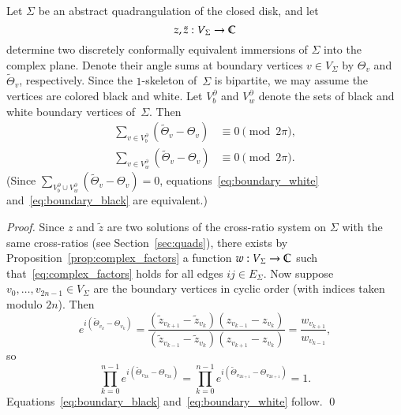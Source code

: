 \documentclass[Thesis]{subfiles}
\begin{document}
\begin{theorem}
  Let $\Sigma$ be an abstract quadrangulation of the closed disk, and
  let 
  \begin{equation*}
    z,\tilde z: V_{\Sigma}\rightarrow\mathbb C
  \end{equation*}
  determine two discretely conformally equivalent immersions of\/
  $\Sigma$ into the complex plane. Denote their angle sums at boundary
  vertices $v\in V_{\Sigma}$ by\/ $\Theta_{v}$ and\/
  $\tilde\Theta_{v}$, respectively. Since the $1$-skeleton of\/~$\Sigma$ is
  bipartite, we may assume the vertices are colored black and
  white. Let $V^{\partial}_{b}$ and $V^{\partial}_{w}$ denote the sets
  of black and white boundary vertices of\/~$\Sigma$. Then
  \begin{align}
    \label{eq:boundary_black}
    \sum_{v\in V^{\partial}_b}(\tilde\Theta_v - \Theta_v)
    &\equiv 0 \pmod{2\pi},\\
    \label{eq:boundary_white}
    \sum_{v\in V^{\partial}_w}(\tilde\Theta_v - \Theta_v)
    &\equiv 0 \pmod{2\pi}.
  \end{align}
  (Since $\sum_{V^{\partial}_b \cup
    V^{\partial}_w}(\tilde\Theta_{v}-\Theta_{v})=0$,
  equations~\eqref{eq:boundary_white} and~\eqref{eq:boundary_black}
  are equivalent.)
\end{theorem}

\begin{proof}
  Since $z$ and $\tilde z$ are two solutions of the cross-ratio system
  on $\Sigma$ with the same cross-ratios (see
  Section~\ref{sec:quads}), there exists by
  Proposition~\ref{prop:complex_factors} a function
  $w:V_{\Sigma}\rightarrow\mathbb C$ such that~\eqref{eq:complex_factors}
  holds for all edges $\mathit{ij}\in E_{\Sigma}$. Now suppose
  $v_{0},\ldots,v_{2n-1}\in V_{\Sigma}$ are the boundary vertices in
  cyclic order (with indices taken modulo $2n$). Then
  \begin{equation*}
    e^{i(\tilde\Theta_{v_{k}} - \Theta_{v_{k}})}=
    \frac{(\tilde z_{v_{k+1}}-\tilde z_{v_{k}})(z_{v_{k-1}}-z_{v_{k}})}%
    {(\tilde z_{v_{k-1}}-\tilde z_{v_{k}})(z_{v_{k+1}}-z_{v_{k}})}
    =\frac{w_{v_{k+1}}}{w_{v_{k-1}}},
  \end{equation*}
  so
  \begin{equation*}
    \prod_{k=0}^{n-1}e^{i(\tilde\Theta_{v_{2k}} - \Theta_{v_{2k}})}=
    \prod_{k=0}^{n-1}e^{i(\tilde\Theta_{v_{2k+1}} -
      \Theta_{v_{2k+1}})}=
    1.
  \end{equation*}
  Equations~\eqref{eq:boundary_black} and~\eqref{eq:boundary_white}
  follow.
  \qed
\end{proof}
\end{document}
